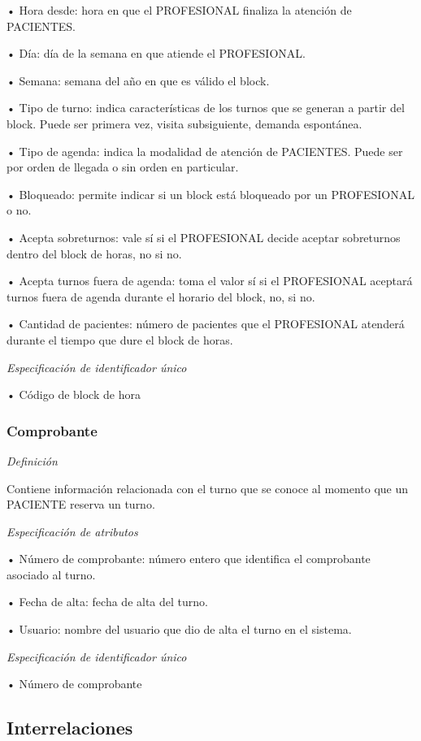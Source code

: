 \documentclass[a4paper,11pt]{article}
\begin{document}
• Hora desde: hora en que el PROFESIONAL finaliza la atención de PACIENTES.

• Día: día de la semana en que atiende el PROFESIONAL.

• Semana: semana del año en que es válido el block.

• Tipo de turno: indica características de los turnos que se generan a partir 
del block. Puede ser primera vez, visita subsiguiente, demanda espontánea.

• Tipo de agenda: indica la modalidad de atención de PACIENTES. Puede ser por 
orden de llegada o sin orden en particular.

• Bloqueado: permite indicar si un block está bloqueado por un PROFESIONAL o 
no.

• Acepta sobreturnos: vale sí si el PROFESIONAL decide aceptar sobreturnos dentro 
del block de horas, no si no.

• Acepta turnos fuera de agenda: toma el valor sí si el PROFESIONAL aceptará 
turnos fuera de agenda durante el horario del block, no, si no.

• Cantidad de pacientes: número de pacientes que el PROFESIONAL atenderá durante 
el tiempo que dure el block de horas.

\textit{Especificación de identificador único}

• Código de block de hora\label{HToc293405816}

\subsubsection{\textbf{Comprobante}}

\textit{Definición}

Contiene información relacionada con el turno que se conoce al momento que un 
PACIENTE reserva un turno.

\textit{Especificación de atributos}

• Número de comprobante: número entero que identifica el comprobante asociado 
al turno.

• Fecha de alta: fecha de alta del turno.

• Usuario: nombre del usuario que dio de alta el turno en el sistema.

\textit{Especificación de identificador único}

• Número de comprobante\label{HToc293405817}

\subsection{\textbf{Interrelaciones\label{HToc293405818}}}
\end{document}
